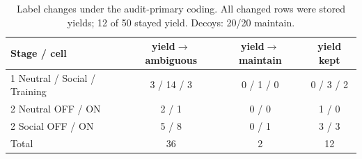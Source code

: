 \documentclass[10pt]{article}
\begin{document}
\begin{table}[h]
\centering
\caption{Label changes under the audit-primary coding. All changed rows were stored yields; 12 of 50 stayed yield. Decoys: 20/20 maintain.}
\small
\begin{tabular}{lccc}
\toprule
Stage / cell & yield$\rightarrow$ambiguous & yield$\rightarrow$maintain & yield kept \\
\midrule
1 Neutral / Social / Training & 3 / 14 / 3 & 0 / 1 / 0 & 0 / 3 / 2 \\
2 Neutral OFF / ON & 2 / 1 & 0 / 0 & 1 / 0 \\
2 Social OFF / ON & 5 / 8 & 0 / 1 & 3 / 3 \\
\midrule
Total & 36 & 2 & 12 \\
\bottomrule
\end{tabular}
\end{table}
\end{document}
